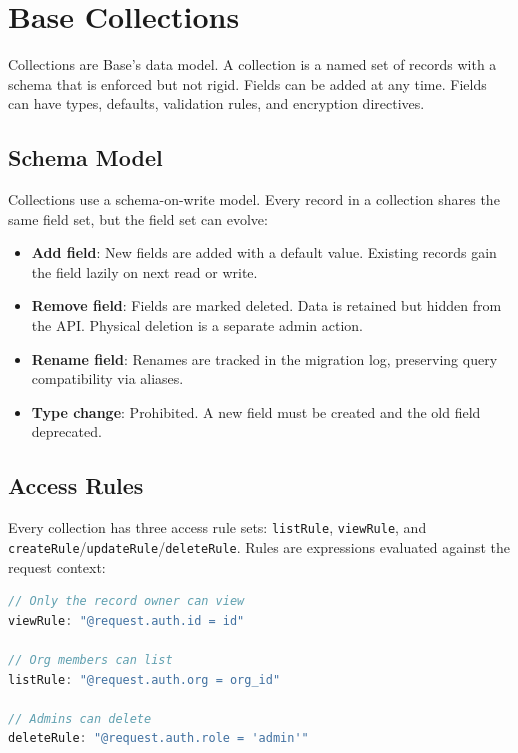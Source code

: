\section{Base Collections}

\label{sec:collections}

Collections are Base's data model. A collection is a named set of records with
a schema that is enforced but not rigid. Fields can be added at any time.
Fields can have types, defaults, validation rules, and encryption directives.

\subsection{Schema Model}

Collections use a schema-on-write model. Every record in a collection shares
the same field set, but the field set can evolve:

\begin{itemize}[leftmargin=1.1em]
    \item \textbf{Add field}: New fields are added with a default value. Existing
    records gain the field lazily on next read or write.
    \item \textbf{Remove field}: Fields are marked deleted. Data is retained
    but hidden from the API. Physical deletion is a separate admin action.
    \item \textbf{Rename field}: Renames are tracked in the migration log,
    preserving query compatibility via aliases.
    \item \textbf{Type change}: Prohibited. A new field must be created and the
    old field deprecated.
\end{itemize}

\subsection{Access Rules}

Every collection has three access rule sets: \texttt{listRule},
\texttt{viewRule}, and \texttt{createRule}/\texttt{updateRule}/\texttt{deleteRule}.
Rules are expressions evaluated against the request context:

\begin{lstlisting}[language=JavaScript,caption={Collection access rules.}]
// Only the record owner can view
viewRule: "@request.auth.id = id"

// Org members can list
listRule: "@request.auth.org = org_id"

// Admins can delete
deleteRule: "@request.auth.role = 'admin'"
\end{lstlisting}

